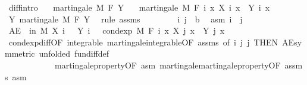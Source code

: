 \begin{isabellebody}
\isamarkupfalse%
%
\endisatagproof
{\isafoldproof}%
%
\isadelimproof
\isanewline
%
\endisadelimproof
\isanewline
{}\isamarkupfalse%
\ diff{\isacharbrackleft}{\kern0pt}intro{\isacharbrackright}{\kern0pt}{\isacharcolon}{\kern0pt}\isanewline
\ \ \ {\isachardoublequoteopen}martingale\ M\ F\ Y{\isachardoublequoteclose}\isanewline
\ \ \ {\isachardoublequoteopen}martingale\ M\ F\ {\isacharparenleft}{\kern0pt}{\isasymlambda}i\ x{\isachardot}{\kern0pt}\ X\ i\ x\ {\isacharminus}{\kern0pt}\ Y\ i\ x{\isacharparenright}{\kern0pt}{\isachardoublequoteclose}\isanewline
%
\isadelimproof
%
\endisadelimproof
%
\isatagproof
{}\isamarkupfalse%
\ {\isacharminus}{\kern0pt}\isanewline
\ \ \isamarkupfalse%
\ Y{\isacharcolon}{\kern0pt}\ martingale\ M\ F\ Y\ \isamarkupfalse%
\ {\isacharparenleft}{\kern0pt}rule\ assms{\isacharparenright}{\kern0pt}\isanewline
\ \ \isacommand{{\isacharbraceleft}{\kern0pt}}\isamarkupfalse%
\isanewline
\ \ \ \ \isamarkupfalse%
\ i\ j\ {\isacharcolon}{\kern0pt}{\isacharcolon}{\kern0pt}\ {\isacharprime}{\kern0pt}b\ \isamarkupfalse%
\ asm{\isacharcolon}{\kern0pt}\ {\isachardoublequoteopen}i\ {\isasymle}\ j{\isachardoublequoteclose}\isanewline
\ \ \ \ \isamarkupfalse%
\ {\isachardoublequoteopen}AE\ {\isasymxi}\ in\ M{\isachardot}{\kern0pt}\ X\ i\ {\isasymxi}\ {\isacharminus}{\kern0pt}\ Y\ i\ {\isasymxi}\ {\isacharequal}{\kern0pt}\ cond{\isacharunderscore}{\kern0pt}exp\ M\ {\isacharparenleft}{\kern0pt}F\ i{\isacharparenright}{\kern0pt}\ {\isacharparenleft}{\kern0pt}{\isasymlambda}x{\isachardot}{\kern0pt}\ X\ j\ x\ {\isacharminus}{\kern0pt}\ Y\ j\ x{\isacharparenright}{\kern0pt}\ {\isasymxi}{\isachardoublequoteclose}\ \isanewline
\ \ \ \ \ \ \isamarkupfalse%
\ cond{\isacharunderscore}{\kern0pt}exp{\isacharunderscore}{\kern0pt}diff{\isacharbrackleft}{\kern0pt}OF\ integrable\ martingale{\isachardot}{\kern0pt}integrable{\isacharbrackleft}{\kern0pt}OF\ assms{\isacharbrackright}{\kern0pt}{\isacharcomma}{\kern0pt}\ of\ i\ j\ j{\isacharcomma}{\kern0pt}\ THEN\ AE{\isacharunderscore}{\kern0pt}symmetric{\isacharcomma}{\kern0pt}\ unfolded\ fun{\isacharunderscore}{\kern0pt}diff{\isacharunderscore}{\kern0pt}def{\isacharbrackright}{\kern0pt}\ \isanewline
\ \ \ \ \ \ \ \ \ \ \ \ martingale{\isacharunderscore}{\kern0pt}property{\isacharbrackleft}{\kern0pt}OF\ asm{\isacharbrackright}{\kern0pt}\ martingale{\isachardot}{\kern0pt}martingale{\isacharunderscore}{\kern0pt}property{\isacharbrackleft}{\kern0pt}OF\ assms\ asm{\isacharbrackright}{\kern0pt}\ \isamarkupfalse%

\end{isabellebody}
